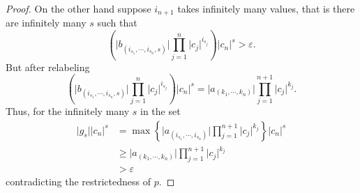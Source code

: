 \begin{proof}
On the other hand suppose $i_{n+1}$ takes infinitely many values, that is there are infinitely many
$s$ such that
\[
  \left( \lvert  b_{(i_{s_1}, \cdots, i_{s_n}, s)} \rvert \prod_{j=1}^{n} \lvert c_j \rvert ^{i_{s_j}} \right) \lvert c_n \rvert^s
  > \varepsilon.
\]
But after relabeling
\[
  \left( \lvert  b_{(i_{s_1}, \cdots, i_{s_n}, s)} \rvert \prod_{j=1}^{n} \lvert c_j \rvert ^{i_{s_j}} \right) \lvert c_n \rvert^s  =
  \lvert  a_{(k_1, \cdots, k_n)} \rvert \prod_{j=1}^{n+1} \lvert c_j \rvert ^{k_j}.
\]
Thus, for the infinitely many $s$ in the set
\begin{align*}
  \lvert g_s \rvert \lvert c_n \rvert^s & = \max \left\{ \lvert  a_{(i_{s_1}, \cdots, i_{s_n})} \rvert
  \prod_{j=1}^{n+1} \lvert c_j \rvert ^{k_j} \right\} \lvert c_n \rvert ^s \\
  & \geq \lvert  a_{(k_1, \cdots, k_n)} \rvert \prod_{j=1}^{n+1} \lvert c_j \rvert ^{k_j} \\
  & > \varepsilon
\end{align*}
contradicting the restrictedness of $p$.
\end{proof}
